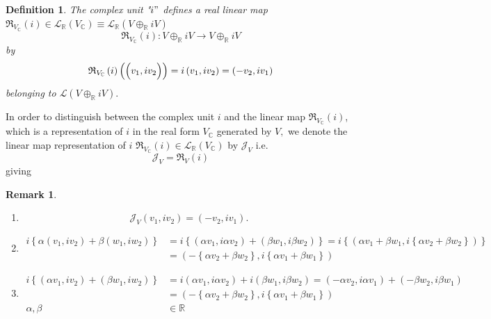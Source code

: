 \documentclass[aps,preprint]{revtex4}
\newtheorem{definition}[theorem]{Definition}
\newtheorem{remark}[theorem]{Remark}
\begin{document}
\begin{definition}
The complex unit "$i"$ defines a real linear map $\mathfrak{R}_{V_{\mathbb{C}%
}}\left( i\right) \in \mathcal{L}_{\mathbb{R}}\left( V_{\mathbb{C}}\right)
\equiv \mathcal{L}_{\mathbb{R}}\left( V\oplus _{\mathbb{R}}iV\right) $ 
\begin{equation}
\mathfrak{R}_{V_{\mathbb{C}}}\left( i\right) :V\oplus _{\mathbb{R}%
}iV\rightarrow V\oplus _{\mathbb{R}}iV
\end{equation}%
by 
\begin{equation}
\mathfrak{R}_{V_{\mathbb{C}}}\left( i\right) \left( \left( \overset{}{%
v_{1},iv_{2}}\right) \right) =i\left( v_{1},iv_{2}\right) =\left(
-v_{2},iv_{1}\right)
\end{equation}%
belonging to $\mathcal{L}\left( V\oplus _{\mathbb{R}}iV\right) .$
\end{definition}

In order to distinguish between the complex unit $i$ and the linear map $%
\mathfrak{R}_{V_{\mathbb{C}}}\left( i\right) $, which is a representation of 
$i$ in the real form $V_{\mathbb{C}}$ generated by $V,$ we denote the linear
map representation of $i$ $\mathfrak{R}_{V_{\mathbb{C}}}\left( i\right) \in 
\mathcal{L}_{\mathbb{R}}\left( V_{\mathbb{C}}\right) $ by $\mathcal{J}_{V}$
i.e.%
\begin{equation}
\mathcal{J}_{V}=\mathfrak{R}_{V}\left( i\right)
\end{equation}%
giving

\begin{remark}
\begin{enumerate}
\item 
\begin{equation}
\mathcal{J}_{V}\left( v_{1},iv_{2}\right) =\left( -v_{2},iv_{1}\right) .
\end{equation}

\item 
\begin{align}
i\left\{ \alpha \left( v_{1},iv_{2}\right) +\beta \left( w_{1},iw_{2}\right)
\right\} & =i\left\{ \left( \alpha v_{1},i\alpha v_{2}\right) +\left( \beta
w_{1},i\beta w_{2}\right) \right\} =i\left\{ \left( \alpha v_{1}+\beta
w_{1},i\left\{ \alpha v_{2}+\beta w_{2}\right\} \right) \right\} \\
& =\left( -\left\{ \alpha v_{2}+\beta w_{2}\right\} ,i\left\{ \alpha
v_{1}+\beta w_{1}\right\} \right)
\end{align}

\item 
\begin{align}
i\left\{ \left( \alpha v_{1},iv_{2}\right) +\left( \beta w_{1},iw_{2}\right)
\right\} & =i\left( \alpha v_{1},i\alpha v_{2}\right) +i\left( \beta
w_{1},i\beta w_{2}\right) =\left( -\alpha v_{2},i\alpha v_{1}\right) +\left(
-\beta w_{2},i\beta w_{1}\right) \\
& =\left( -\left\{ \alpha v_{2}+\beta w_{2}\right\} ,i\left\{ \alpha
v_{1}+\beta w_{1}\right\} \right) \\
\alpha ,\beta & \in \mathbb{R}
\end{align}
\end{enumerate}
\end{remark}
\end{document}
